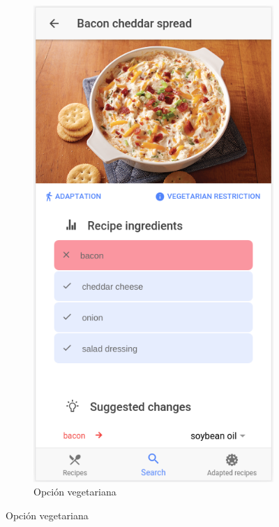 \begin{figure}[H]
\begin{subfigure}[b]{0.31\linewidth}
    \end{subfigure}
    \begin{subfigure}[b]{0.308\linewidth}
        \includegraphics[width=\linewidth]{imagenes/app/pantallas/ejemplo7.png}
        \caption{Opción vegetariana}
        \label{fig:ejemplo7}

\end{subfigure}
\end{figure}
